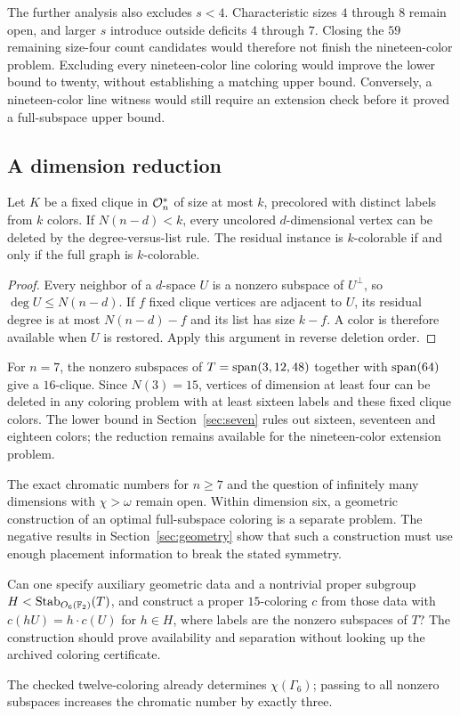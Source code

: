 The further analysis also excludes $s<4$. Characteristic sizes
$4$ through $8$ remain open, and larger $s$ introduce outside
deficits $4$ through $7$. Closing the $59$ remaining size-four count candidates
would therefore not finish the nineteen-color problem. Excluding
every nineteen-color line coloring would improve the lower bound
to twenty, without establishing a matching upper bound. Conversely,
a nineteen-color line witness would still require an extension
check before it proved a full-subspace upper bound.

\subsection{A dimension reduction}

\begin{proposition}\label{prop:dimension-deletion}
Let $K$ be a fixed clique in $\mathcal O_n^*$ of size at most $k$,
precolored with distinct labels from $k$ colors. If $N(n-d)<k$,
every uncolored $d$-dimensional vertex can be deleted by the
degree-versus-list rule. The residual instance is $k$-colorable
if and only if the full graph is $k$-colorable.
\end{proposition}
\begin{proof}
Every neighbor of a $d$-space $U$ is a nonzero subspace of
$U^\perp$, so $\deg U\leq N(n-d)$. If $f$ fixed clique vertices
are adjacent to $U$, its residual degree is at most $N(n-d)-f$
and its list has size $k-f$. A color is therefore available when
$U$ is restored. Apply this argument in reverse deletion order.
\end{proof}

For $n=7$, the nonzero subspaces of $T=\operatorname{span}(3,12,48)$ together
with $\operatorname{span}(64)$ give a $16$-clique. Since $N(3)=15$, vertices
of dimension at least four can be deleted in any coloring problem
with at least sixteen labels and these fixed clique colors.
The lower bound in Section~\ref{sec:seven} rules out sixteen,
seventeen and eighteen colors; the reduction remains available
for the nineteen-color extension problem.

The exact chromatic numbers for $n\geq7$ and the question of
infinitely many dimensions with $\chi>\omega$ remain open.
Within dimension six, a geometric construction of an optimal
full-subspace coloring is a separate problem. The negative
results in Section~\ref{sec:geometry} show that such a construction
must use enough placement information to break the stated symmetry.

\begin{problem}\label{prob:structural}
Can one specify auxiliary geometric data and a nontrivial proper
subgroup $H<\operatorname{Stab}_{O_6(\mathbb F_2)}(T)$, and construct a
proper $15$-coloring $c$ from those data with $c(hU)=h\cdot c(U)$
for $h\in H$, where labels are the nonzero subspaces of $T$?
The construction should prove availability and separation without
looking up the archived coloring certificate.
\end{problem}

The checked twelve-coloring already determines $\chi(\Gamma_6)$;
passing to all nonzero subspaces increases the chromatic number
by exactly three.

